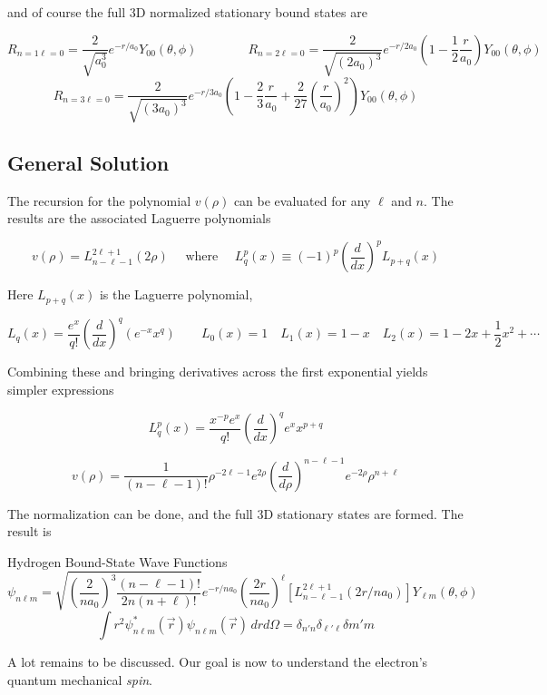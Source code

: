 and of course the full 3D normalized stationary bound states are 

\[ R_{n=1\ell =0} = \frac{2}{\sqrt{a_0^3}}e^{-r / a_0} Y_{00} (\theta, \phi) \qquad \qquad R_{n=2
  \ell =0} = \frac{2}{\sqrt{(2a_0)^3}}e^{-r / 2a_0} \left( 1 - \frac{1}{2}
\frac{r}{a_0} \right)Y_{00} (\theta, \phi) \] 
\[ R_{n=3 \ell = 0} = \frac{2}{\sqrt{(3a_0)^3}}e^{-r / 3a_0} \left(
  1 - \frac{2}{3} \frac{r}{a_0} + \frac{2}{27} \left( \frac{r}{a_0} \right)^2
\right)Y_{00} (\theta, \phi)  \] \vspace{3px}



\subsection{General Solution}

The recursion for the polynomial $v(\rho)$ can be evaluated for any $\ell $ and
$n$. The results are the associated Laguerre polynomials 

\[
  v(\rho) = L_{n - \ell -1}^{2\ell +1} (2\rho) \quad \text{ where } \quad
  L_q^p(x) \equiv (-1)^p \left( \frac{d }{d x}  \right) ^p L_{p+q}(x) 
\] \vspace{3px}

Here $L_{p+q}(x)$ is the Laguerre polynomial, 

\[
  L_q(x) = \frac{e^x}{q!} \left( \frac{d }{d x}  \right) ^q (e^{-x} x^q) \qquad
  L_0(x) = 1 \quad L_1(x) = 1-x \quad L_2(x) = 1 - 2x + \frac{1}{2}x^2 + \cdots
\] \vspace{3px}

Combining these and bringing derivatives across the first exponential yields
simpler expressions

\[
  L_q^p(x) = \frac{x^{-p} e^x}{q!} \left( \frac{d }{d x}  \right) ^q e^x
x^{p+q} \]  

\[ v(\rho) = \frac{1}{(n - \ell - 1)!} \rho^{-2\ell - 1} e^{2\rho} \left(
\frac{d }{d \rho}  \right) ^{n - \ell - 1} e^{-2\rho} \rho^{n + \ell } \]
\vspace{3px}

The normalization can be done, and the full 3D stationary states are formed.
The result is 

\begin{subbox}{Hydrogen Bound-State Wave Functions}
  \[ \psi_{n\ell m} = \sqrt{ \left( \frac{2}{na_0} \right) ^3 \frac{(n - \ell
    - 1)!}{2n(n+\ell)! } }e^{-r / na_0} \left( \frac{2r}{na_0} \right) ^\ell
    \left[ L_{n - \ell -1}^{2\ell +1} (2r / na_0) \right] Y_{\ell m}(\theta,
    \phi) \] \[ \int r^2 \psi^*_{n\ell m}(\vec{r}) \psi_{n \ell m}(\vec{r}) \,
  dr d\Omega = \delta_{n'n}\delta_{\ell ' \ell } \delta{m'm} \] \vspace{3px}
\end{subbox}


A lot remains to be discussed. Our goal is now to understand the electron's quantum mechanical
\textit{spin}. 




